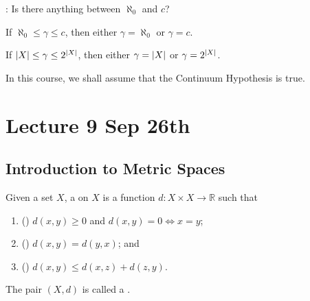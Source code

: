 \documentclass[notoc,notitlepage]{tufte-book}
\begin{document}
: Is there anything between $\aleph_0$ and $c$?

\begin{axiom}\label{axiom:continuum_hypothesis}
  If $\aleph_0 \leq \gamma \leq c$, then either $\gamma = \aleph_0$ or $\gamma = c$.
\end{axiom}

\begin{axiom}\label{axiom:generalized_continuum_hypothesis}
  If $\left|X\right| \leq \gamma \leq 2^{\left|X\right|}$, then either $\gamma = \left|X\right|$ or $\gamma = 2^{\left|X\right|}$.
\end{axiom}

In this course, we shall assume that the Continuum Hypothesis is true.




\chapter{Lecture 9 Sep 26th}%
\label{chp:lecture_9_sep_26th}

\section{Introduction to Metric Spaces}%
\label{sec:introduction_to_metric_spaces}

\begin{defn}\label{defn:metric_n_metric_space}
  Given a set $X$, a  on $X$ is a function $d : X \times X \to \mathbb{R}$ such that
  \begin{enumerate}
    \item () $d(x, y) \geq 0$ and $d(x, y) = 0 \iff x = y$;
    \item () $d(x, y) = d(y, x)$; and
    \item () $d(x, y) \leq d(x, z) + d(z, y)$.
  \end{enumerate}
  The pair $(X, d)$ is called a .
\end{defn}
\end{document}
